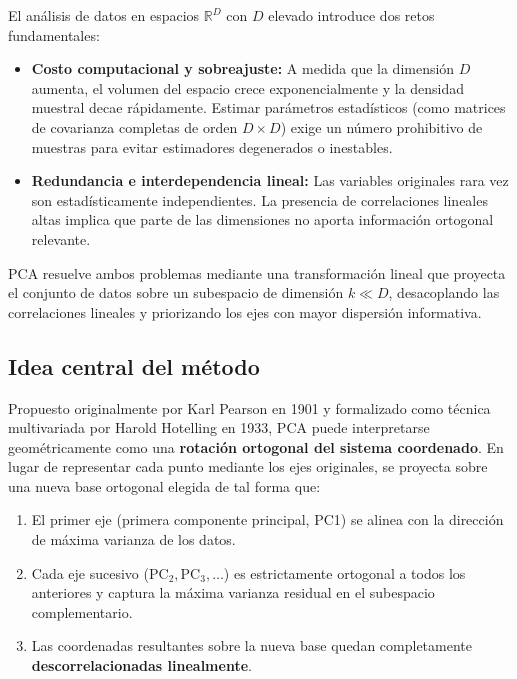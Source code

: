 \documentclass[11pt,letterpaper]{article}
\begin{document}
	El análisis de datos en espacios $\mathbb{R}^D$ con $D$ elevado introduce dos retos fundamentales:
	
	\begin{itemize}[itemsep=2pt]
		\item \textbf{Costo computacional y sobreajuste:} A medida que la dimensión $D$ aumenta, el volumen del espacio crece exponencialmente y la densidad muestral decae rápidamente. Estimar parámetros estadísticos (como matrices de covarianza completas de orden $D\times D$) exige un número prohibitivo de muestras para evitar estimadores degenerados o inestables.
		\item \textbf{Redundancia e interdependencia lineal:} Las variables originales rara vez son estadísticamente independientes. La presencia de correlaciones lineales altas implica que parte de las dimensiones no aporta información ortogonal relevante.
	\end{itemize}
	
	PCA resuelve ambos problemas mediante una transformación lineal que proyecta el conjunto de datos sobre un subespacio de dimensión $k \ll D$, desacoplando las correlaciones lineales y priorizando los ejes con mayor dispersión informativa.
	
	\subsection{Idea central del método}
	
	Propuesto originalmente por Karl Pearson en 1901 y formalizado como técnica multivariada por Harold Hotelling en 1933, PCA puede interpretarse geométricamente como una \textbf{rotación ortogonal del sistema coordenado}. En lugar de representar cada punto mediante los ejes originales, se proyecta sobre una nueva base ortogonal elegida de tal forma que:
	
	\begin{enumerate}[itemsep=2pt]
		\item El primer eje (primera componente principal, PC1) se alinea con la dirección de máxima varianza de los datos.
		\item Cada eje sucesivo ($\text{PC}_2, \text{PC}_3, \dots$) es estrictamente ortogonal a todos los anteriores y captura la máxima varianza residual en el subespacio complementario.
		\item Las coordenadas resultantes sobre la nueva base quedan completamente \textbf{descorrelacionadas linealmente}.
	\end{enumerate}
	
\end{document}
